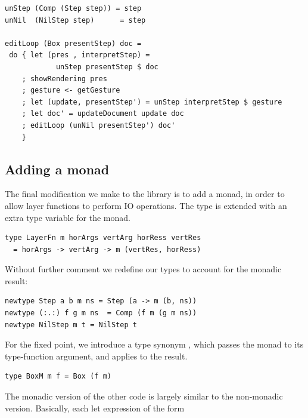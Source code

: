 \documentclass{llncs}
\begin{document}
\begin{small}
\begin{verbatim}
unStep (Comp (Step step)) = step
unNil  (NilStep step)      = step

editLoop (Box presentStep) doc = 
 do { let (pres , interpretStep) = 
            unStep presentStep $ doc   
    ; showRendering pres
    ; gesture <- getGesture    
    ; let (update, presentStep') = unStep interpretStep $ gesture    
    ; let doc' = updateDocument update doc
    ; editLoop (unNil presentStep') doc'
    }
\end{verbatim}%
\end{small}
\ec
\subsection{Adding a monad}


The final modification we make to the library is to add a monad, in order to allow layer functions to perform IO operations. The type  is extended with an extra type variable  for the monad.

\begin{small}
\begin{verbatim}
type LayerFn m horArgs vertArg horRess vertRes 
  = horArgs -> vertArg -> m (vertRes, horRess)
\end{verbatim}
\end{small}

Without further comment we redefine our types to account for the monadic result:

\begin{small}
\begin{verbatim}
newtype Step a b m ns = Step (a -> m (b, ns))
newtype (:.:) f g m ns  = Comp (f m (g m ns))
newtype NilStep m t = NilStep t
\end{verbatim}
\end{small}

\noindent
For the fixed point, we introduce a type synonym , which passes the monad to its type-function argument, and applies  to the result.

\begin{small}
\begin{verbatim}
type BoxM m f = Box (f m)
\end{verbatim}
\end{small}

The monadic version of the other code is largely similar to the non-monadic version. Basically, each let expression of the form\\
\end{document}
